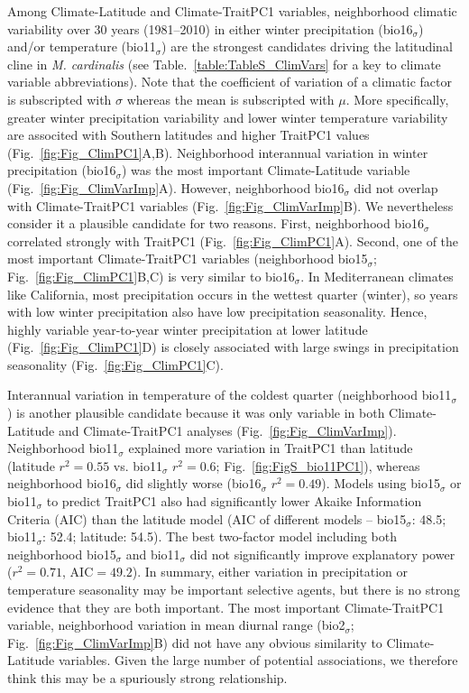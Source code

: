 \documentclass[11pt, oneside]{article}
\begin{document}
Among Climate-Latitude and Climate-TraitPC1 variables, neighborhood climatic variability over 30 years (1981--2010) in either winter precipitation (bio16$_\sigma$) and/or temperature (bio11$_\sigma$) are the strongest candidates driving the latitudinal cline in \textit{M. cardinalis} (see Table.~\ref{table:TableS_ClimVars} for a key to climate variable abbreviations). Note that the coefficient of variation of a climatic factor is subscripted with $\sigma$ whereas the mean is subscripted with $\mu$. More specifically, greater winter precipitation variability and lower winter temperature variability are associted with Southern latitudes and higher TraitPC1 values (Fig.~\ref{fig:Fig_ClimPC1}A,B). Neighborhood interannual variation in winter precipitation (bio16$_\sigma$) was the most important Climate-Latitude variable (Fig.~\ref{fig:Fig_ClimVarImp}A). However, neighborhood bio16$_\sigma$ did not overlap with Climate-TraitPC1 variables (Fig.~\ref{fig:Fig_ClimVarImp}B). We nevertheless consider it a plausible candidate for two reasons. First, neighborhood bio16$_\sigma$ correlated strongly with TraitPC1 (Fig.~\ref{fig:Fig_ClimPC1}A). Second, one of the most important Climate-TraitPC1 variables (neighborhood bio15$_\sigma$; Fig.~\ref{fig:Fig_ClimPC1}B,C) is very similar to bio16$_\sigma$. In Mediterranean climates like California, most precipitation occurs in the wettest quarter (winter), so years with low winter precipitation also have low precipitation seasonality. Hence, highly variable year-to-year winter precipitation at lower latitude (Fig.~\ref{fig:Fig_ClimPC1}D) is closely associated with large swings in precipitation seasonality (Fig.~\ref{fig:Fig_ClimPC1}C). 

Interannual variation in temperature of the coldest quarter (neighborhood bio11$_\sigma$) is another plausible candidate because it was only variable in both Climate-Latitude and Climate-TraitPC1 analyses (Fig.~\ref{fig:Fig_ClimVarImp}). Neighborhood bio11$_\sigma$ explained more variation in TraitPC1 than latitude (latitude $r^2=0.55$ vs. bio11$_\sigma$ $r^2=0.6$; Fig.~\ref{fig:FigS_bio11PC1}), whereas neighborhood bio16$_\sigma$ did slightly worse (bio16$_\sigma$ $r^2=0.49$). Models using bio15$_\sigma$ or bio11$_\sigma$ to predict TraitPC1 also had significantly lower Akaike Information Criteria (AIC) than the latitude model (AIC of different models -- bio15$_\sigma$: 48.5; bio11$_\sigma$: 52.4; latitude: 54.5). The best two-factor model including both neighborhood bio15$_\sigma$ and bio11$_\sigma$ did not significantly improve explanatory power ($r^2=0.71$, AIC$=49.2$). In summary, either variation in precipitation or temperature seasonality may be important selective agents, but there is no strong evidence that they are both important. The most important Climate-TraitPC1 variable, neighborhood variation in mean diurnal range (bio2$_\sigma$; Fig.~\ref{fig:Fig_ClimVarImp}B) did not have any obvious similarity to Climate-Latitude variables. Given the large number of potential associations, we therefore think this may be a spuriously strong relationship.
\end{document}
